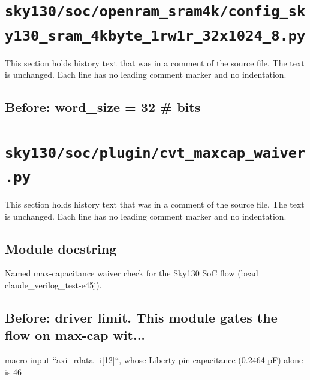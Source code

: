 \section{\texttt{sky130/soc/openram\_sram4k/config\_sky130\_sram\_4kbyte\_1rw1r\_32x1024\_8.py}}\label{cr:pd:sky130-soc-openram-sram4k-config-sky130-sram-4kbyte-1rw1r-32x1024-8-py}

This section holds history text that was in a comment of the source file. The text is unchanged. Each line has no leading comment marker and no indentation.

\begin{record}

\subsection*{Before: word\_size = 32   \# bits}


\end{record}

\section{\texttt{sky130/soc/plugin/cvt\_maxcap\_waiver.py}}\label{cr:pd:sky130-soc-plugin-cvt-maxcap-waiver-py}

This section holds history text that was in a comment of the source file. The text is unchanged. Each line has no leading comment marker and no indentation.

\begin{record}

\subsection*{Module docstring}

\begin{textblock}
Named max-capacitance waiver check for the Sky130 SoC flow (bead claude_verilog_test-e45j).
\end{textblock}

\subsection*{Before: driver limit.  This module gates the flow on max-cap wit...}

\begin{textblock}
macro input ``axi_rdata_i[12]``, whose Liberty pin capacitance (0.2464 pF) alone is 46 %
\end{textblock}

\end{record}


